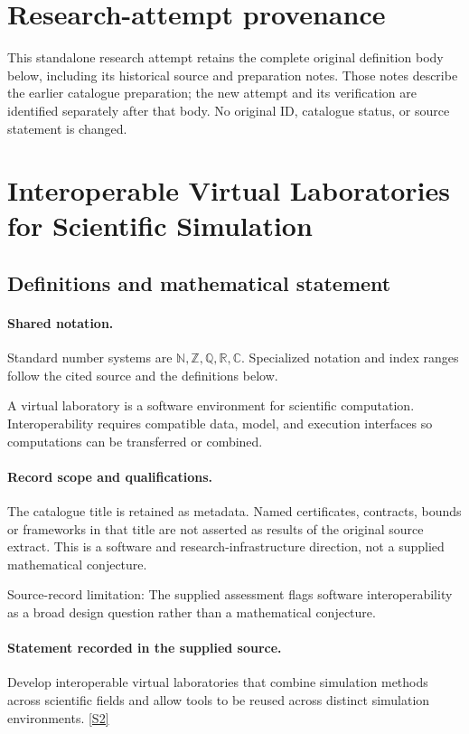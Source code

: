 \documentclass[11pt]{article}
\begin{document}
\section*{Research-attempt provenance}
This standalone research attempt retains the complete original definition body below,
including its historical source and preparation notes. Those notes describe the
earlier catalogue preparation; the new attempt and its verification are identified
separately after that body. No original ID, catalogue status, or source statement is changed.

\section{Interoperable Virtual Laboratories for Scientific Simulation}\label{statement}

\subsection{Definitions and mathematical statement}

\paragraph{Shared notation.}Standard number systems are $\mathbb N,\mathbb Z,\mathbb Q,\mathbb R,\mathbb C$. Specialized notation and index ranges follow the cited source and the definitions below.


A virtual laboratory is a software environment for scientific computation. Interoperability requires compatible data, model, and execution interfaces so computations can be transferred or combined.
\paragraph{Record scope and qualifications.}
The catalogue title is retained as metadata. Named certificates, contracts, bounds or frameworks in that title are not asserted as results of the original source extract.
This is a software and research-infrastructure direction, not a supplied mathematical conjecture.

Source-record limitation: The supplied assessment flags software interoperability as a broad design question rather than a mathematical conjecture.
\paragraph{Statement recorded in the supplied source.}
Develop interoperable virtual laboratories that combine simulation methods across scientific fields and allow tools to be reused across distinct simulation environments. \href{https://doi.org/10.4171/owr/2023/26}{[S2]}
\end{document}

